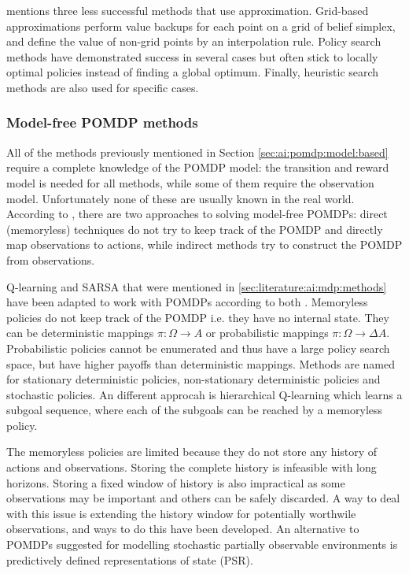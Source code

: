 \textcite{Spaan2012ai+pomdp} mentions three less successful methods that use
approximation. Grid-based approximations perform value backups for each point
on a grid of belief simplex, and define the value of non-grid points by an
interpolation rule. Policy search methods have demonstrated success in several
cases but often stick to locally optimal policies instead of finding a global
optimum. Finally, heuristic search methods are also used for specific cases.


\subsubsection{Model-free POMDP methods}
\label{sec:ai:pomdp:model:free}

All of the methods previously mentioned in Section
\ref{sec:ai:pomdp:model:based} require a complete knowledge of the POMDP model:
the transition and reward model is needed for all methods, while some of them
require the observation model. Unfortunately none of these are usually known in
the real world. According to \textcite{Spaan2012ai+pomdp}, there are two
approaches to solving model-free POMDPs: direct (memoryless) techniques do not
try to keep track of the POMDP and directly map observations to actions, while
indirect methods try to construct the POMDP from observations.

Q-learning and SARSA that were mentioned in \ref{sec:literature:ai:mdp:methods}
have been adapted to work with POMDPs according to both
\textcite{Russell2010ai+modern, Spaan2012ai+pomdp}. Memoryless policies do not
keep track of the POMDP i.e. they have no internal state. They can be
deterministic mappings \(\pi : \Omega \rightarrow A \) or probabilistic
mappings \(\pi : \Omega \rightarrow \Delta A \). Probabilistic policies cannot
be enumerated and thus have a large policy search space, but have higher
payoffs than deterministic mappings. Methods are named for stationary
deterministic policies, non-stationary deterministic policies and stochastic
policies. An different approcah is hierarchical Q-learning which learns a
subgoal sequence, where each of the subgoals can be reached by a memoryless
policy. \parencite{Spaan2012ai+pomdp}

The memoryless policies are limited because they do not store any history of
actions and observations. Storing the complete history is infeasible with long
horizons. Storing a fixed window of history is also impractical as some
observations may be important and others can be safely discarded. A way to deal
with this issue is extending the history window for potentially worthwile
observations, and ways to do this have been developed. An alternative to POMDPs
suggested for modelling stochastic partially observable environments is
predictively defined representations of state (PSR).
\parencite{Spaan2012ai+pomdp}

